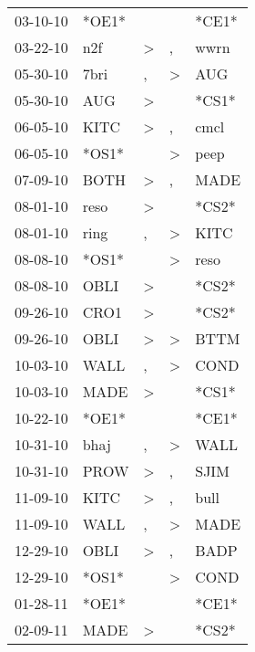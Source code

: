 \begin{supertabular}{lllll}
 03-10-10 &  *OE1* &                  &                  &  *CE1* \\
 03-22-10 &    n2f &     \textgreater &                , &   wwrn \\
 05-30-10 &   7bri &                , &     \textgreater &    AUG \\
 05-30-10 &    AUG &     \textgreater &                  &  *CS1* \\
 06-05-10 &   KITC &     \textgreater &                , &   cmcl \\
 06-05-10 &  *OS1* &                  &     \textgreater &   peep \\
 07-09-10 &   BOTH &     \textgreater &                , &   MADE \\
 08-01-10 &   reso &     \textgreater &                  &  *CS2* \\
 08-01-10 &   ring &                , &     \textgreater &   KITC \\
 08-08-10 &  *OS1* &                  &     \textgreater &   reso \\
 08-08-10 &   OBLI &     \textgreater &                  &  *CS2* \\
 09-26-10 &   CRO1 &     \textgreater &                  &  *CS2* \\
 09-26-10 &   OBLI &     \textgreater &     \textgreater &   BTTM \\
 10-03-10 &   WALL &                , &     \textgreater &   COND \\
 10-03-10 &   MADE &     \textgreater &                  &  *CS1* \\
 10-22-10 &  *OE1* &                  &                  &  *CE1* \\
 10-31-10 &   bhaj &                , &     \textgreater &   WALL \\
 10-31-10 &   PROW &     \textgreater &                , &   SJIM \\
 11-09-10 &   KITC &     \textgreater &                , &   bull \\
 11-09-10 &   WALL &                , &     \textgreater &   MADE \\
 12-29-10 &   OBLI &     \textgreater &                , &   BADP \\
 12-29-10 &  *OS1* &                  &     \textgreater &   COND \\
 01-28-11 &  *OE1* &                  &                  &  *CE1* \\
 02-09-11 &   MADE &     \textgreater &                  &  *CS2* \\

\end{supertabular}
